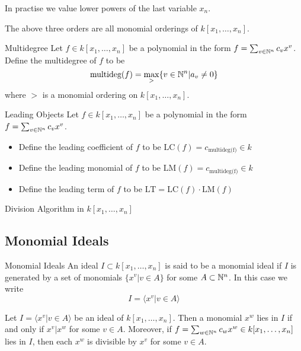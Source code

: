\documentclass[a4paper]{article}
\begin{document}
In practise we value lower powers of the last variable $x_n$. 

\begin{prp}{}{} The above three orders are all monomial orderings of $k[x_1,\dots,x_n]$. 
\end{prp}

\begin{defn}{Multidegree}{} Let $f\in k[x_1,\dots,x_n]$ be a polynomial in the form $f=\sum_{v\in\mathbb{N}^n}c_vx^v$. Define the multidegree of $f$ to be $$\text{multideg}(f)=\max_>\{v\in\mathbb{N}^n|a_v\neq 0\}$$ where $>$ is a monomial ordering on $k[x_1,\dots,x_n]$. 
\end{defn}

\begin{defn}{Leading Objects}{} Let $f\in k[x_1,\dots,x_n]$ be a polynomial in the form $f=\sum_{v\in\mathbb{N}^n}c_vx^v$. 
\begin{itemize}
\item Define the leading coefficient of $f$ to be $\text{LC}(f)=c_\text{multideg(f)}\in k$
\item Define the leading monomial of $f$ to be $\text{LM}(f)=c_\text{multideg(f)}\in k$
\item Define the leading term of $f$ to be $\text{LT}=\text{LC}(f)\cdot\text{LM}(f)$
\end{itemize}
\end{defn}

\begin{prp}{Division Algorithm in $k[x_1,\dots,x_n]$}{}
\end{prp}

\subsection{Monomial Ideals}
\begin{defn}{Monomial Ideals}{} An ideal $I\subset k[x_1,\dots,x_n]$ is said to be a monomial ideal if $I$ is generated by a set of monomials $\{x^v|v\in A\}$ for some $A\subset\mathbb{N}^n$. In this case we write $$I=\langle x^v|v\in A\rangle$$
\end{defn}

\begin{lmm}{}{} Let $I=\langle x^v|v\in A\rangle$ be an ideal of $k[x_1,\dots,x_n]$. Then a monomial $x^w$ lies in $I$ if and only if $x^v|x^w$ for some $v\in A$. Moreover, if $f=\sum_{w\in\mathbb{N}^n}c_wx^w\in k[x_1,\dots,x_n]$ lies in $I$, then each $x^w$ is divisible by $x^v$ for some $v\in A$. 
\end{lmm}
\end{document}

